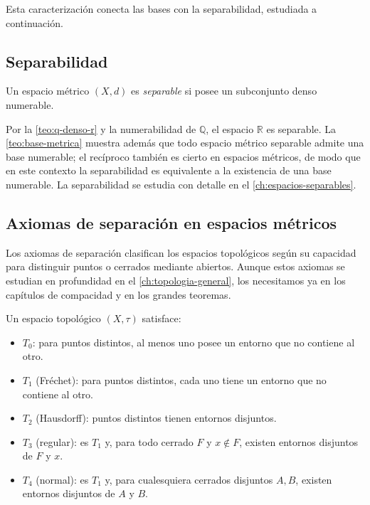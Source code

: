 Esta caracterización conecta las bases con la separabilidad, estudiada a continuación.

\subsection{Separabilidad}

\begin{definition}
\label{def:separabilidad}
Un espacio métrico $(X,d)$ es \emph{separable} si posee un subconjunto denso numerable.
\end{definition}

Por la \cref{teo:q-denso-r} y la numerabilidad de $\mathbb{Q}$, el espacio $\mathbb{R}$ es separable. La \cref{teo:base-metrica} muestra además que todo espacio métrico separable admite una base numerable; el recíproco también es cierto en espacios métricos, de modo que en este contexto la separabilidad es equivalente a la existencia de una base numerable. La separabilidad se estudia con detalle en el \cref{ch:espacios-separables}.

\subsection{Axiomas de separación en espacios métricos}

Los axiomas de separación clasifican los espacios topológicos según su capacidad para distinguir puntos o cerrados mediante abiertos. Aunque estos axiomas se estudian en profundidad en el \cref{ch:topologia-general}, los necesitamos ya en los capítulos de compacidad y en los grandes teoremas.

\begin{definition}
\label{def:separacion-metrico}
Un espacio topológico $(X,\tau)$ satisface:
\begin{itemize}
  \item $T_0$: para puntos distintos, al menos uno posee un entorno que no contiene al otro.
  \item $T_1$ (Fréchet): para puntos distintos, cada uno tiene un entorno que no contiene al otro.
  \item $T_2$ (Hausdorff): puntos distintos tienen entornos disjuntos.
  \item $T_3$ (regular): es $T_1$ y, para todo cerrado $F$ y $x\notin F$, existen entornos disjuntos de $F$ y $x$.
  \item $T_4$ (normal): es $T_1$ y, para cualesquiera cerrados disjuntos $A,B$, existen entornos disjuntos de $A$ y $B$.
\end{itemize}
\end{definition}

